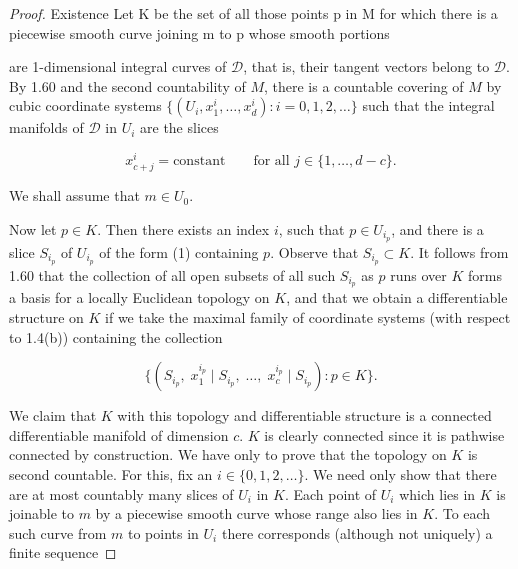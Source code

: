 \begin{proof}
	Existence Let K be the set of all those points p in M for which there is a piecewise smooth curve joining m to p whose smooth portions

	\begin{center}
	\end{center}


	are 1-dimensional integral curves of $\mathcal{D}$, that is, their tangent vectors belong to $\mathcal{D}$. By 1.60 and the second countability of $M$, there is a countable covering of $M$ by cubic coordinate systems $\{(U_{i}, x_{1}^{i}, \ldots, x_{d}^{i})\colon i = 0, 1, 2, \ldots\}$ such that the integral manifolds of $\mathcal{D}$ in $U_{i}$ are the slices

	\begin{equation}
		\tag{1}\label{eq:1.64:1}
		x_{c+j}^{i}=\mathrm{constant}\qquad\text{for all }j\in\{1,\ldots,d-c\}.
	\end{equation}

	We shall assume that $m \in U_{0}$.

	Now let $p \in K$. Then there exists an index $i$, such that $p \in U_{i_p}$, and there is a slice $S_{i_p}$ of $U_{i_p}$ of the form (1) containing $p$. Observe that $S_{i_p} \subset K$. It follows from 1.60 that the collection of all open subsets of all such $S_{i_p}$ as $p$ runs over $K$ forms a basis for a locally Euclidean topology on $K$, and that we obtain a differentiable structure on $K$ if we take the maximal family of coordinate systems (with respect to 1.4(b)) containing the collection

	\begin{equation}
		\tag{2}\label{eq:1.64:2}
		\{(S_{i_{p}},\;x_{1}^{i_{p}}\;\big|\;S_{i_{p}},\;\ldots,\;x_{c}^{i_{p}}\;\big|\;S_{i_{p}}):p\in K\}.
	\end{equation}

	We claim that $K$ with this topology and differentiable structure is a connected differentiable manifold of dimension $c$. $K$ is clearly connected since it is pathwise connected by construction. We have only to prove that the topology on $K$ is second countable. For this, fix an $i\in\{0,1,2,\ldots\}$. We need only show that there are at most countably many slices of $U_{i}$ in $K$. Each point of $U_{i}$ which lies in $K$ is joinable to $m$ by a piecewise smooth curve whose range also lies in $K$. To each such curve from $m$ to points in $U_{i}$ there corresponds (although not uniquely) a finite sequence


\end{proof}
